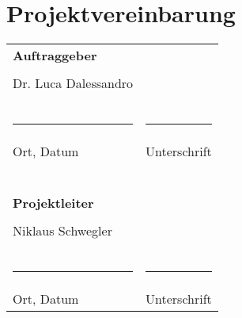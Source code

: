 \section{Projektvereinbarung} \label{sec:projektvereinbarung}
\begin{tabular}{l l}
\textbf{Auftraggeber} &\\
&\\
Dr. Luca Dalessandro \\
&\\
&\\
&\\
\rule{6cm}{0.5pt} & \rule{6cm}{0.5pt}\\
Ort, Datum & Unterschrift\\
&\\
&\\
&\\
&\\
&\\
&\\
\textbf{Projektleiter} &\\
&\\
Niklaus Schwegler&\\
&\\
&\\
&\\
\rule{6cm}{0.5pt} & \rule{6cm}{0.5pt}\\
Ort, Datum & Unterschrift\\
\end{tabular}

